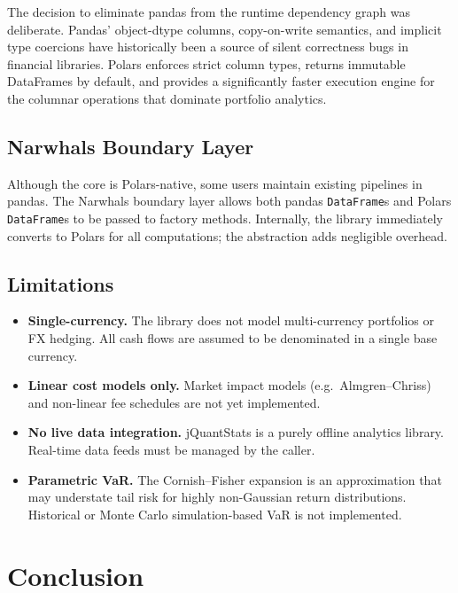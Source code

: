 \documentclass[11pt,a4paper]{article}
\begin{document}
The decision to eliminate pandas from the runtime dependency graph was
deliberate.  Pandas' object-dtype columns, copy-on-write semantics, and
implicit type coercions have historically been a source of silent correctness
bugs in financial libraries.  Polars enforces strict column types, returns
immutable DataFrames by default, and provides a significantly faster execution
engine for the columnar operations that dominate portfolio analytics.

\subsection{Narwhals Boundary Layer}

Although the core is Polars-native, some users maintain existing pipelines in
pandas.  The Narwhals boundary layer allows both pandas \texttt{DataFrame}s
and Polars \texttt{DataFrame}s to be passed to factory methods.  Internally,
the library immediately converts to Polars for all computations; the
abstraction adds negligible overhead.

\subsection{Limitations}

\begin{itemize}
  \item \textbf{Single-currency.}  The library does not model multi-currency
    portfolios or FX hedging.  All cash flows are assumed to be denominated
    in a single base currency.
  \item \textbf{Linear cost models only.}  Market impact models (e.g.\
    Almgren–Chriss) and non-linear fee schedules are not yet implemented.
  \item \textbf{No live data integration.}  jQuantStats is a purely offline
    analytics library.  Real-time data feeds must be managed by the caller.
  \item \textbf{Parametric VaR.}  The Cornish–Fisher expansion is an
    approximation that may understate tail risk for highly non-Gaussian
    return distributions.  Historical or Monte Carlo simulation-based VaR
    is not implemented.
\end{itemize}

\section{Conclusion}
\label{sec:conclusion}
\end{document}
